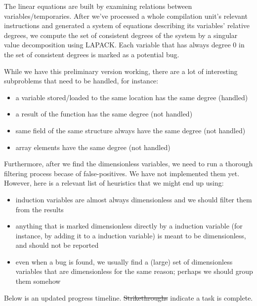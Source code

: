 \documentclass[12pt]{article}
\begin{document}
The linear equations are built by examining relations between variables/temporaries. After we've processed a whole compilation unit's relevant instructions and generated a system of equations describing its variables' relative degrees, we compute the set of consistent degrees of the system by a singular value decomposition using LAPACK. Each variable that has always degree 0 in the set of consistent degrees is marked as a potential bug.

While we have this preliminary version working, there are a lot of interesting subproblems that need to be handled, for instance:
\begin{itemize}
  \item a variable stored/loaded to the same location has the same degree (handled)
  \item a result of the function has the same degree (not handled)
  \item same field of the same structure always have the same degree (not handled)
  \item array elements have the same degree (not handled)
\end{itemize}

Furthermore, after we find the dimensionless variables, we need to run a thorough filtering process becase of false-positives. We have not implemented them yet. However, here is a relevant list of heuristics that we might end up using:
\begin{itemize}
  \item induction variables are almost always dimensionless and we should filter them from the results
  \item anything that is marked dimensionless directly by a induction variable (for instance, by adding it to a induction variable) is meant to be dimensionless, and should not be reported
  \item even when a bug is found, we usually find a (large) set of dimensionless variables that are dimensionless for the same reason; perhaps we should group them somehow
\end{itemize}

Below is an updated progress timeline.
\sout{Strikethroughs} indicate a task is complete.
\end{document}

